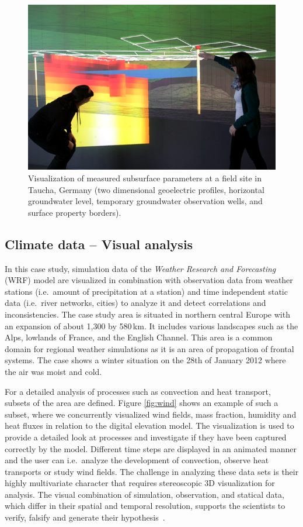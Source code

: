 \documentclass[twocolumn]{svjour3}          %
\begin{document}
\begin{figure}[htb]
  \includegraphics[width=\linewidth]{images/geothermal_shallow.png}
  \caption{Visualization of measured subsurface parameters at a field site in Taucha, Germany (two dimensional geoelectric profiles, horizontal groundwater level, temporary groundwater observation wells, and surface property borders).}
\label{fig:geothermal_shallow}
\end{figure}

\subsection{Climate data -- Visual analysis}
\label{climate-data}

In this case study, simulation data of the \emph{Weather Research and Forecasting} (WRF) model are visualized in combination with observation data from weather stations (i.e.~amount of precipitation at a station) and time independent static data (i.e.~river networks, cities) to analyze it and detect correlations and inconsistencies. The case study area is situated in northern central Europe with an expansion of about 1,300 by 580\,km. It includes various landscapes such as the Alps, lowlands of France, and the English Channel. This area is a common domain for regional weather simulations as it is an area of propagation of frontal systems. The case shows a winter situation on the 28th of January 2012 where the air was moist and cold.

For a detailed analysis of processes such as convection and heat transport, subsets of the area are defined. Figure \ref{fig:wind} shows an example of such a subset, where we concurrently visualized wind fields, mass fraction, humidity and heat fluxes in relation to the digital elevation model. The visualization is used to provide a detailed look at processes and investigate if they have been captured correctly by the model. Different time steps are displayed in an animated manner and the user can i.e.~analyze the development of convection, observe heat transports or study wind fields. The challenge in analyzing these data sets is their highly multivariate character that requires stereoscopic 3D visualization for analysis. The visual combination of simulation, observation, and statical data, which differ in their spatial and temporal resolution, supports the scientists to verify, falsify and generate their hypothesis~\cite{helbig:eesenvirvis}.
\end{document}
